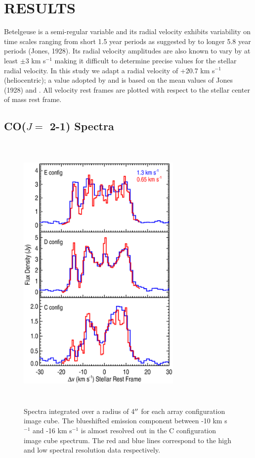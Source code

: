 \documentclass[apj]{emulateapj}
\begin{document}
\section{RESULTS} 

Betelgeuse is a  semi-regular variable and its radial velocity exhibits variability on time scales ranging from short 1.5 year periods as suggested by \cite{1931PWasO..15..178S} to longer 5.8 year periods (Jones, 1928). Its radial velocity amplitudes are also known to vary by at least $\pm$3 km s${}^{-1}$ \citep{1989AJ.....98.2233S} making it difficult to determine precise values for the stellar radial velocity. In this study we adapt a radial velocity of +20.7 km s${}^{-1}$ (heliocentric); a value adopted by \citet{2008AJ....135.1430H} and is based on the mean values of Jones (1928) and \cite{1933CMWCI.464....1S}. All velocity rest frames are plotted with respect to the stellar center of mass rest frame.

\subsection{CO($J=$ 2-1) Spectra} \label{results1} %

\begin{figure}
\includegraphics[trim=90pt 60pt 45pt 50pt, clip, width=8.0cm, height=14.0cm]{f1.eps}
\caption{Spectra integrated over a radius of 4$\mbox{$^{\prime\prime}$}$ for each array configuration image cube. The blueshifted emission component between -10 km s${}^{-1}$ and -16 km s${}^{-1}$ is almost resolved out in the C configuration image cube spectrum. The red and blue lines correspond to the high and low spectral resolution data respectively.\label{fig1}}
\label{fig:fig1}
\end{figure}
\end{document}
